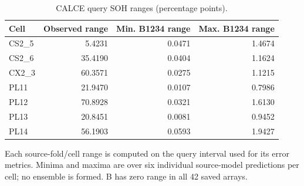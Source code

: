 \begin{table}[H]\centering
\caption{CALCE query SOH ranges (percentage points).}\label{tab:sranges}
\papertablesize\setlength{\tabcolsep}{4pt}\renewcommand{\arraystretch}{1.15}
\begin{tabular}{lrrr}\toprule
Cell & Observed range & Min. B1234 range & Max. B1234 range \\ \midrule
CS2\_5 & 5.4231 & 0.0471 & 1.4674 \\
CS2\_6 & 35.4190 & 0.0404 & 1.1624 \\
CX2\_3 & 60.3571 & 0.0275 & 1.1215 \\
PL11 & 21.9470 & 0.0107 & 0.7986 \\
PL12 & 70.8928 & 0.0321 & 1.6130 \\
PL13 & 20.8451 & 0.0081 & 0.9452 \\
PL14 & 56.1903 & 0.0593 & 1.9427 \\
\bottomrule\end{tabular}
\par\smallskip\begin{minipage}{\linewidth}\papertablesize Each source-fold/cell range is computed on the query interval used for its error metrics. Minima and maxima are over six individual source-model predictions per cell; no ensemble is formed. B has zero range in all 42 saved arrays.\end{minipage}
\end{table}
